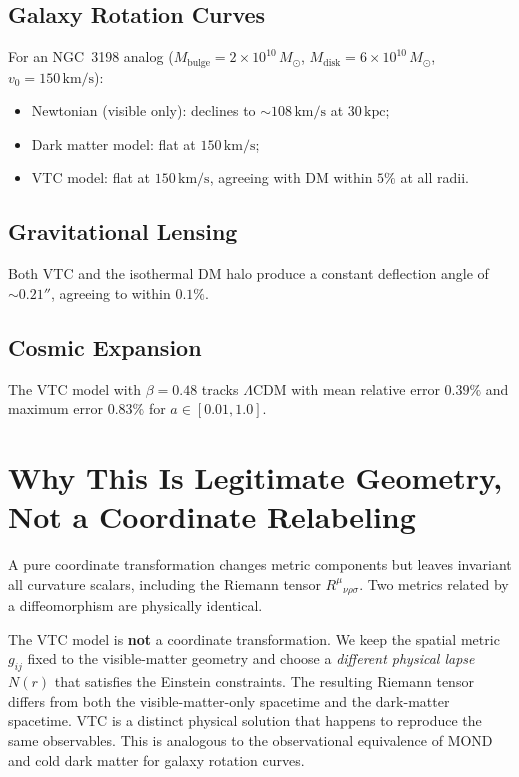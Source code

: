 \documentclass[11pt,a4paper]{article}
\theoremstyle{definition}
\newcommand{\bulge}{\mathrm{bulge}}
\newcommand{\disk}{\mathrm{disk}}
\begin{document}
\subsection*{Galaxy Rotation Curves}
For an NGC~3198 analog ($M_{\bulge}=2\times10^{10}\,M_\odot$, $M_{\disk}=6\times10^{10}\,M_\odot$, $v_0=150\,\mathrm{km/s}$):
\begin{itemize}
    \item Newtonian (visible only): declines to $\sim 108\,\mathrm{km/s}$ at $30\,\mathrm{kpc}$;
    \item Dark matter model: flat at $150\,\mathrm{km/s}$;
    \item VTC model: flat at $150\,\mathrm{km/s}$, agreeing with DM within $5\%$ at all radii.
\end{itemize}

\subsection*{Gravitational Lensing}
Both VTC and the isothermal DM halo produce a constant deflection angle of $\sim 0.21''$, agreeing to within $0.1\%$.

\subsection*{Cosmic Expansion}
The VTC model with $\beta=0.48$ tracks $\Lambda$CDM with mean relative error $0.39\%$ and maximum error $0.83\%$ for $a\in[0.01,1.0]$.

\section{Why This Is Legitimate Geometry, Not a Coordinate Relabeling}

A pure coordinate transformation changes metric components but leaves invariant all curvature scalars, including the Riemann tensor $R^{\mu}{}_{\nu\rho\sigma}$. Two metrics related by a diffeomorphism are physically identical.

The VTC model is \textbf{not} a coordinate transformation. We keep the spatial metric $g_{ij}$ fixed to the visible-matter geometry and choose a \textit{different physical lapse} $N(r)$ that satisfies the Einstein constraints. The resulting Riemann tensor differs from both the visible-matter-only spacetime and the dark-matter spacetime. VTC is a distinct physical solution that happens to reproduce the same observables. This is analogous to the observational equivalence of MOND and cold dark matter for galaxy rotation curves.
\end{document}

